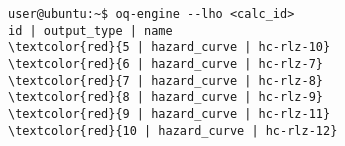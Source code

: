 \begin{Verbatim}[frame=single, commandchars=\\\{\}, fontsize=\small]
user@ubuntu:~$ oq-engine --lho <calc_id>
id | output_type | name
\textcolor{red}{5 | hazard_curve | hc-rlz-10}
\textcolor{red}{6 | hazard_curve | hc-rlz-7}
\textcolor{red}{7 | hazard_curve | hc-rlz-8}
\textcolor{red}{8 | hazard_curve | hc-rlz-9}
\textcolor{red}{9 | hazard_curve | hc-rlz-11}
\textcolor{red}{10 | hazard_curve | hc-rlz-12}
\end{Verbatim}